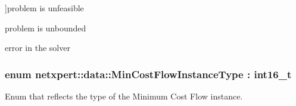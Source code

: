 \begin{Desc}
\begin{description}
{}]problem is unfeasible \item[{\em 
M\+C\+F\+Unbounded\hypertarget{namespacenetxpert_1_1data_a0ea30f651c6cc7e7a6edd5a5cbe6346cac92d71e95a9b3d967e1175e1165e2190}{}\label{namespacenetxpert_1_1data_a0ea30f651c6cc7e7a6edd5a5cbe6346cac92d71e95a9b3d967e1175e1165e2190}
}]problem is unbounded \item[{\em 
M\+C\+F\+Error\hypertarget{namespacenetxpert_1_1data_a0ea30f651c6cc7e7a6edd5a5cbe6346ca2943143373d2c1ff4e0384d6d9635084}{}\label{namespacenetxpert_1_1data_a0ea30f651c6cc7e7a6edd5a5cbe6346ca2943143373d2c1ff4e0384d6d9635084}
}]error in the solver \end{description}
\end{Desc}
\subsubsection[{\texorpdfstring{Min\+Cost\+Flow\+Instance\+Type}{MinCostFlowInstanceType}}]{\setlength{\rightskip}{0pt plus 5cm}enum {\bf netxpert\+::data\+::\+Min\+Cost\+Flow\+Instance\+Type} \+: int16\+\_\+t}\hypertarget{namespacenetxpert_1_1data_a9504ea932b3debceb4ba7f6831e80bbd}{}\label{namespacenetxpert_1_1data_a9504ea932b3debceb4ba7f6831e80bbd}


Enum that reflects the type of the Minimum Cost Flow instance. 


